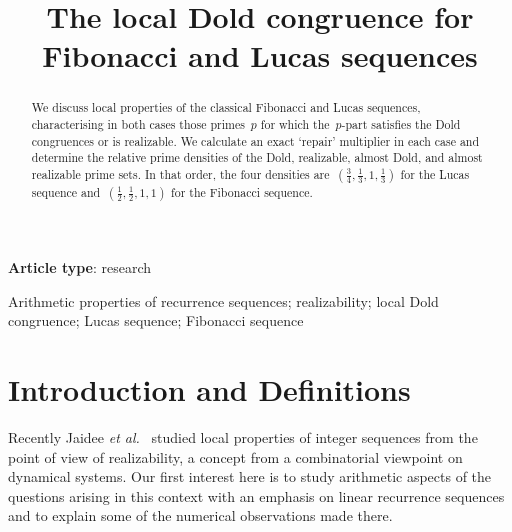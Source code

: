 \documentclass[]{interact}
\makeatletter
\newcommand{\monthyear}[1]{%
  \def\@monthyear{\uppercase{#1}}}
\newcommand{\volnumber}[1]{%
  \def\@volnumber{\uppercase{#1}}}
\theoremstyle{plain}
\numberwithin{equation}{section} %
\numberwithin{table}{section} %
\numberwithin{figure}{section}
\makeatother
\begin{document}
\monthyear{Month Year}
\volnumber{Volume, Number}
\setcounter{page}{1}

\title{The local Dold congruence for Fibonacci and Lucas sequences}

\author{
}


\maketitle

{\bf Article type}: research %
\bigskip

\begin{abstract}
We discuss local properties of the classical
Fibonacci and Lucas sequences, characterising
in both cases those primes~$p$ for which the~$p$-part
satisfies the Dold congruences or is realizable. We calculate
an exact `repair' multiplier in each case and determine the
relative prime densities of the Dold, realizable, almost Dold,
and almost realizable prime sets. In that order, the four densities
are~$(\frac34,\frac13,1,\frac13)$ for the Lucas sequence
and~$(\frac12,\frac12,1,1)$ for the Fibonacci sequence.
\end{abstract}

\begin{keywords}
Arithmetic properties of recurrence sequences; realizability;
local Dold congruence; Lucas sequence; Fibonacci sequence
\end{keywords}

\section{Introduction and Definitions}

Recently Jaidee {\it{et al.}}~\cite{MR5076929} studied local
properties of integer sequences from the point of view
of realizability, a concept from a combinatorial
viewpoint on dynamical systems.
Our first interest here is to study
arithmetic aspects of the questions arising
in this context with an emphasis on linear recurrence sequences and
to explain some of the numerical observations made there.
\end{document}
